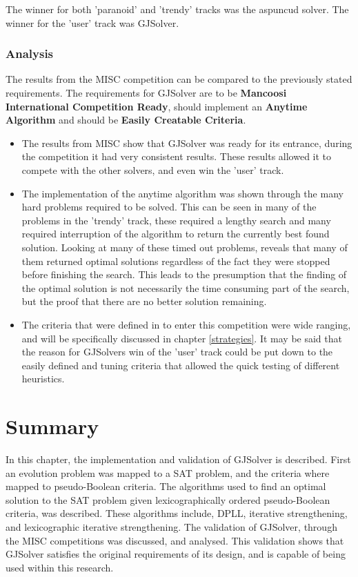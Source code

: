 The winner for both 'paranoid' and 'trendy' tracks was the aspuncud solver.
The winner for the 'user' track was GJSolver.

\subsubsection{Analysis}
The results from the MISC competition can be compared to the previously stated requirements.
The requirements for GJSolver are to be \textbf{Mancoosi International Competition Ready}, should implement an \textbf{Anytime Algorithm} and should be \textbf{Easily Creatable Criteria}.

\begin{itemize}
  \item The results from MISC show that GJSolver was ready for its entrance, during the competition it had very consistent results.
These results allowed it to compete with the other solvers, and even win the 'user' track.
\item The implementation of the anytime algorithm was shown through the many hard problems required to be solved.
This can be seen in many of the problems in the 'trendy' track, these required a lengthy search and many required interruption of the algorithm to return the currently best found solution.
Looking at many of these timed out problems, reveals that many of them returned optimal solutions regardless of the fact they were stopped before finishing the search.
This leads to the presumption that the finding of the optimal solution is not necessarily the time consuming part of the search, but the proof that there are no better solution remaining.
\item The criteria that were defined in to enter this competition were wide ranging, and will be specifically discussed in chapter \ref{strategies}.
It may be said that the reason for GJSolvers win of the 'user' track could be put down to the easily defined and tuning criteria that allowed the quick testing of different heuristics.
\end{itemize}

\section{Summary}
In this chapter, the implementation and validation of GJSolver is described.
First an evolution problem was mapped to a SAT problem, and the criteria where mapped to pseudo-Boolean criteria.
The algorithms used to find an optimal solution to the SAT problem given lexicographically ordered pseudo-Boolean criteria, was described.
These algorithms include, DPLL, iterative strengthening, and lexicographic iterative strengthening.
The validation of GJSolver, through the MISC competitions was discussed, and analysed.
This validation shows that GJSolver satisfies the original requirements of its design, and is capable of being used within this research. 
